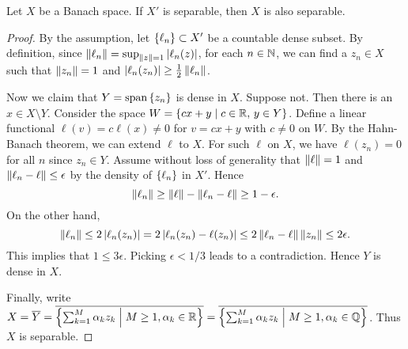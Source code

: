 \begin{theorem}\label{thm:dual_separable}
    Let $X$ be a Banach space. If $X'$ is separable, then $X$ 
    is also separable.
\end{theorem}
\begin{proof}
    By the assumption, let $\left\{ {\ell_n} \right\}\subset X'$ be a countable 
    dense subset. By definition, since $\left\lVert {\ell_n} \right\rVert = \sup_{\left\lVert {z} \right\rVert=1}\left\lvert {\ell_n(z)} \right\rvert$, 
    for each $n\in\mathbb{N}$, we can find a $z_n\in X$ such that $\left\lVert {z_n} \right\rVert = 1$ and 
    $\left\lvert {\ell_n(z_n)} \right\rvert \geq \frac{1}{2}\left\lVert {\ell_n} \right\rVert$. 
    
    Now we claim that $Y = \operatorname{span}\left\{ {z_n} \right\}$ is dense in $X$. 
    Suppose not. Then there is an $x\in X\setminus Y$. Consider 
    the space $W = \left\{ cx+y \;\middle\vert\; c\in\mathbb{R},\, y\in Y \right\}$. Define a linear 
    functional $\ell(v) = c\ell(x)\neq 0$ for $v = cx+y$ with $c\neq 0$ 
    on $W$. By the Hahn-Banach theorem, we can extend $\ell$ to $X$. 
    For such $\ell$ on $X$, we have $\ell(z_n) = 0$ for all $n$ since 
    $z_n\in Y$. Assume without loss of generality that $\left\lVert {\ell} \right\rVert = 1$ 
    and $\left\lVert {\ell_n-\ell} \right\rVert\leq\epsilon$ by the density of $\left\{ {\ell_n} \right\}$ 
    in $X'$. Hence 
    \begin{equation*}
        \left\lVert {\ell_n} \right\rVert \geq \left\lVert {\ell} \right\rVert - \left\lVert {\ell_n-\ell} \right\rVert \geq 1-\epsilon.
    \end{equation*}
    On the other hand, 
    \begin{equation*}
        \left\lVert {\ell_n} \right\rVert\leq 2\left\lvert {\ell_n(z_n)} \right\rvert = 2\left\lvert {\ell_n(z_n) - \ell(z_n)} \right\rvert 
        \leq 2\left\lVert {\ell_n-\ell} \right\rVert\left\lVert {z_n} \right\rVert \leq 2\epsilon.
    \end{equation*}
    This implies that $1\leq 3\epsilon$. Picking $\epsilon<1/3$ leads 
    to a contradiction. Hence $Y$ is dense in $X$. 

    Finally, write $X = \overline{Y} = \overline{\left\{ \sum_{k=1}^{M}\alpha_kz_k \;\middle\vert\; M\geq 1, \alpha_k\in\mathbb{R} \right\}} 
    = \overline{\left\{ \sum_{k=1}^{M}\alpha_kz_k \;\middle\vert\; M\geq 1, \alpha_k\in\mathbb{Q} \right\}}$. 
    Thus $X$ is separable. 
\end{proof}

